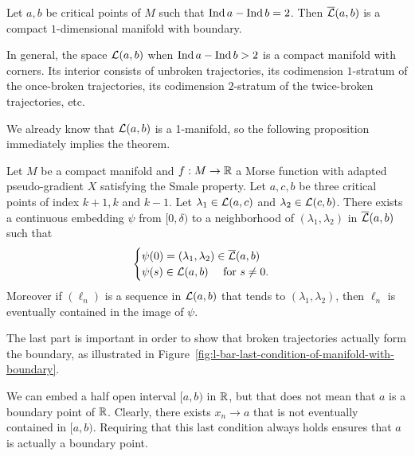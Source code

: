 \begin{theorem}
    Let $a, b$ be critical points of  $M$ such that  $\operatorname{Ind} a - \operatorname{Ind} b = 2$. Then  $\overline{\mathcal L}(a, b)$ is a compact  $1$-dimensional manifold with boundary.
\end{theorem}

\begin{remark}
    In general, the space $\mathcal L(a, b) $ when $\operatorname{Ind} a - \operatorname{Ind} b > 2$ is a compact manifold with corners.
    Its interior consists of unbroken trajectories, its codimension $1$-stratum of the once-broken trajectories, its codimension $2$-stratum of the twice-broken trajectories, etc.
\end{remark}

We already know that $\mathcal L(a, b)$ is a 1-manifold, so the following proposition immediately implies the theorem.

\begin{prop}
    Let $M$ be a compact manifold and $f: M \to  \mathbb{R}$ a Morse function with adapted pseudo-gradient $X$ satisfying the Smale property. Let  $a,c,b$ be three critical points of index $k+1, k$ and $k-1$. Let $\lambda_1 \in \mathcal L(a, c)$ and $\lambda_2 \in \mathcal L(c, b)$.
    There exists a continuous embedding $\psi$ from $[0, \delta)$ to a neighborhood of $(\lambda_1, \lambda_2)$ in $\overline{\mathcal L}(a, b)$ such that
    \[
    \begin{cases}
        \psi(0) = (\lambda_1, \lambda_2) \in \overline{\mathcal L}(a, b)\\
        \psi(s) \in \mathcal L(a, b) \quad \text{ for } s \neq 0.
    \end{cases}
    \] 
    Moreover if $(\ell_n)$ is a sequence in $\mathcal L(a, b)$ that tends to $(\lambda_1, \lambda_2)$, then $ \ell_n$ is eventually contained in the image of $\psi$.
\end{prop}

The last part is important in order to show that broken trajectories actually form the boundary, as illustrated in Figure~\ref{fig:l-bar-last-condition-of-manifold-with-boundary}.
\begin{marginfigure}
    \centering
    \caption{We can embed a half open interval $[a, b)$ in $\mathbb{R}$, but that does not mean that $a$ is a boundary point of $\mathbb{R}$. Clearly, there exists $x_n \to a$ that is not eventually contained in $[a,b)$.
        Requiring that this last condition always holds ensures that $a$ is actually a boundary point.
    }
    \label{fig:l-bar-last-condition-of-manifold-with-boundary}
\end{marginfigure}


